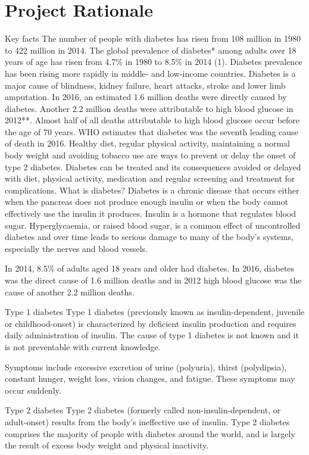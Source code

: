 \documentclass[12pt]{article}
\begin{document}
\section{Project Rationale}
Key facts
The number of people with diabetes has risen from 108 million in 1980 to 422 million in 2014.
The global prevalence of diabetes* among adults over 18 years of age has risen from 4.7\% in 1980 to 8.5\% in 2014 (1).
Diabetes prevalence has been rising more rapidly in middle- and low-income countries.
Diabetes is a major cause of blindness, kidney failure, heart attacks, stroke and lower limb amputation.
In 2016, an estimated 1.6 million deaths were directly caused by diabetes. Another 2.2 million deaths were attributable to high blood glucose in 2012**.
Almost half of all deaths attributable to high blood glucose occur before the age of 70 years. WHO estimates that diabetes was the seventh leading cause of death in 2016.
Healthy diet, regular physical activity, maintaining a normal body weight and avoiding tobacco use are ways to prevent or delay the onset of type 2 diabetes.
Diabetes can be treated and its consequences avoided or delayed with diet, physical activity, medication and regular screening and treatment for complications.
What is diabetes?
Diabetes is a chronic disease that occurs either when the pancreas does not produce enough insulin or when the body cannot effectively use the insulin it produces. Insulin is a hormone that regulates blood sugar. Hyperglycaemia, or raised blood sugar, is a common effect of uncontrolled diabetes and over time leads to serious damage to many of the body's systems, especially the nerves and blood vessels.

In 2014, 8.5\% of adults aged 18 years and older had diabetes. In 2016, diabetes was the direct cause of 1.6 million deaths and in 2012 high blood glucose was the cause of another 2.2 million deaths.

Type 1 diabetes
Type 1 diabetes (previously known as insulin-dependent, juvenile or childhood-onset) is characterized by deficient insulin production and requires daily administration of insulin. The cause of type 1 diabetes is not known and it is not preventable with current knowledge.

Symptoms include excessive excretion of urine (polyuria), thirst (polydipsia), constant hunger, weight loss, vision changes, and fatigue. These symptoms may occur suddenly.

Type 2 diabetes
Type 2 diabetes (formerly called non-insulin-dependent, or adult-onset) results from the body’s ineffective use of insulin. Type 2 diabetes comprises the majority of people with diabetes around the world, and is largely the result of excess body weight and physical inactivity.
\end{document}
